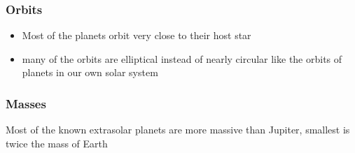 \documentclass[12pt]{article}
\begin{document}
\subsubsection*{Orbits}
\begin{itemize}
\item Most of the planets orbit very close to their host star
\item many of the orbits are elliptical instead of nearly circular like the orbits of planets in our own solar system
\end{itemize}

\subsubsection*{Masses}
Most of the known extrasolar planets are more massive than Jupiter, smallest is twice the mass of Earth
\end{document}
